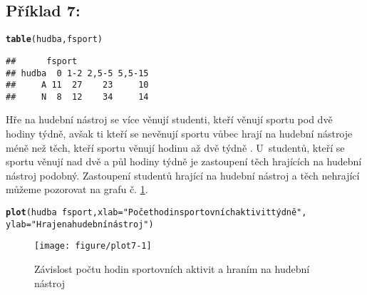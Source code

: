 \documentclass[twoside]{article}\usepackage[]{graphicx}\usepackage[]{color}
\makeatletter
\def\maxwidth{ %
  \ifdim\Gin@nat@width>\linewidth
    \linewidth
  \else
    \Gin@nat@width
  \fi
}
\newcommand{\hlstr}[1]{\textcolor[rgb]{0.192,0.494,0.8}{#1}}%
\newcommand{\hlopt}[1]{\textcolor[rgb]{0,0,0}{#1}}%
\newcommand{\hlstd}[1]{\textcolor[rgb]{0.345,0.345,0.345}{#1}}%
\newcommand{\hlkwc}[1]{\textcolor[rgb]{0.333,0.667,0.333}{#1}}%
\newcommand{\hlkwd}[1]{\textcolor[rgb]{0.737,0.353,0.396}{\textbf{#1}}}%
\newenvironment{kframe}{%
 \def\at@end@of@kframe{}%
 \ifinner\ifhmode%
  \def\at@end@of@kframe{\end{minipage}}%
  \begin{minipage}{\columnwidth}%
 \fi\fi%
 \def\FrameCommand##1{\hskip\@totalleftmargin \hskip-\fboxsep
 \colorbox{shadecolor}{##1}\hskip-\fboxsep
     \hskip-\linewidth \hskip-\@totalleftmargin \hskip\columnwidth}%
 \MakeFramed {\advance\hsize-\width
   \@totalleftmargin\z@ \linewidth\hsize
   \@setminipage}}%
 {\par\unskip\endMakeFramed%
 \at@end@of@kframe}
\newenvironment{knitrout}{}{} %
\makeatother
\begin{document}
\subsection*{Příklad 7:}
\begin{knitrout}
\color{fgcolor}\begin{kframe}
\begin{alltt}
\hlkwd{table}\hlstd{(hudba,fsport)}
\end{alltt}
\begin{verbatim}
##      fsport
## hudba  0 1-2 2,5-5 5,5-15
##     A 11  27    23     10
##     N  8  12    34     14
\end{verbatim}
\end{kframe}
\end{knitrout}

Hře na hudební nástroj se více věnují studenti, kteří věnují sportu pod dvě hodiny týdně, avšak ti kteří se nevěnují sportu vůbec hrají na hudební nástroje méně než těch, kteří sportu věnují hodinu až dvě týdně . U~studentů, kteří se sportu věnují nad dvě a půl hodiny týdně je zastoupení těch hrajících na hudební nástroj podobný. Zastoupení studentů hrající na hudební nástroj a těch nehrající můžeme pozorovat na grafu č. \ref{fig:plot7}.

\begin{knitrout}
\color{fgcolor}\begin{kframe}
\begin{alltt}
\hlkwd{plot}\hlstd{(hudba}\hlopt{~}\hlstd{fsport,} \hlkwc{xlab}\hlstd{=}\hlstr{"Počet hodin sportovních aktivit týdně"}\hlstd{,}
    \hlkwc{ylab}\hlstd{=}\hlstr{"Hraje na hudební nástroj"}\hlstd{)}
\end{alltt}
\end{kframe}\begin{figure}[h]
\texttt{[image: figure/plot7-1]} \caption[Závislost počtu hodin sportovních aktivit a hraním na hudební nástroj]{Závislost počtu hodin sportovních aktivit a hraním na hudební nástroj}\label{fig:plot7}
\end{figure}


\end{knitrout}
\end{document}
